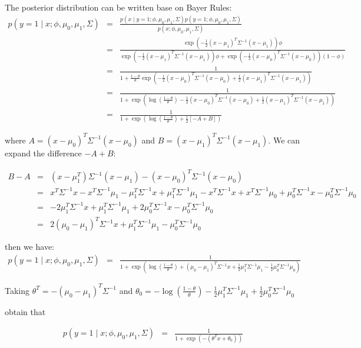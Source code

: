 \begin{answer}
The posterior distribution can be written base on Bayer Rules: 
%
\begin{eqnarray*}
	p(y = 1\mid x; \phi, \mu_0, \mu_1, \Sigma) &=& \frac{p(x\mid y=1; \phi, \mu_0, \mu_1, \Sigma) p(y = 1; \phi, \mu_0, \mu_1, \Sigma)}{p(x; \phi, \mu_0, \mu_1, \Sigma)} \\
&=& \frac{\exp\left(-\frac{1}{2}(x-\mu_1)^T \Sigma^{-1} (x-\mu_1) \right)\phi}{\exp\left(-\frac{1}{2}(x-\mu_1)^T \Sigma^{-1} (x-\mu_1) \right)\phi +\exp\left(-\frac{1}{2}(x-\mu_{0})^T \Sigma^{-1} (x-\mu_{0})\right) (1-\phi) }\\
&=& \frac{1}{1+ \frac{ 1- \theta}{\theta} \exp\left(-\frac{1}{2}(x-\mu_{0})^T \Sigma^{-1} (x-\mu_{0}) + \frac{1}{2}(x-\mu_1)^T \Sigma^{-1} (x-\mu_1) \right) }\\
&=& \frac{1}{1+  \exp\left(\log(\frac{ 1- \theta}{\theta})-\frac{1}{2}(x-\mu_{0})^T \Sigma^{-1} (x-\mu_{0}) + \frac{1}{2}(x-\mu_1)^T \Sigma^{-1} (x-\mu_1) \right) }\\
&=& \frac{1}{1+  \exp\left(\log(\frac{ 1- \theta}{\theta})+\frac{1}{2} [- A + B ] \right) }
\end{eqnarray*}

where  $A = (x-\mu_{0})^T \Sigma^{-1} (x-\mu_{0})$ and  $B = (x-\mu_1)^T \Sigma^{-1} (x-\mu_1)$. We can expand the difference $-A + B$:

\begin{eqnarray*}
B-A &=& (x-\mu_{1}^T)\Sigma^{-1} (x-\mu_{1}) - (x-\mu_{0})^T \Sigma^{-1} (x-\mu_{0})\\
&=& x^T\Sigma^{-1}x -x^T\Sigma^{-1}\mu_{1} -\mu_{1}^T\Sigma^{-1}x + \mu_{1}^T\Sigma^{-1}\mu_{1} -x^T\Sigma^{-1}x +x^T\Sigma^{-1}\mu_{0} +\mu_{0}^T\Sigma^{-1}x -\mu_{0}^T\Sigma^{-1}\mu_{0} \\
&=& -2\mu_{1}^T\Sigma^{-1}x + \mu_{1}^T\Sigma^{-1}\mu_{1} +2\mu_{0}^T\Sigma^{-1}x -\mu_{0}^T\Sigma^{-1}\mu_{0} \\
&=& 2(\mu_{0} - \mu_{1})^T\Sigma^{-1}x + \mu_{1}^T\Sigma^{-1}\mu_{1} -\mu_{0}^T\Sigma^{-1}\mu_{0}
\end{eqnarray*}

then we have:
\begin{eqnarray*}
p(y = 1\mid x; \phi, \mu_0, \mu_1, \Sigma) &=& \frac{1}{1+  \exp\left(\log(\frac{ 1- \theta}{\theta})+ (\mu_{0} - \mu_{1})^T\Sigma^{-1}x + \frac{1}{2}\mu_{1}^T\Sigma^{-1}\mu_{1} -\frac{1}{2}\mu_{0}^T\Sigma^{-1}\mu_{0} \right) }
\end{eqnarray*}

Taking $\theta^T = -(\mu_{0} - \mu_{1})^T\Sigma^{-1}$ and $\theta_{0} =-\log(\frac{ 1- \theta}{\theta})-  \frac{1}{2}\mu_{1}^T\Sigma^{-1}\mu_{1} +\frac{1}{2}\mu_{0}^T\Sigma^{-1}\mu_{0}$ 

obtain that

\begin{eqnarray*}
p(y = 1\mid x; \phi, \mu_0, \mu_1, \Sigma) &=& \frac{1}{1+  \exp\left( -(\theta^{T}x + \theta_{0}) \right) }
\end{eqnarray*}


%

\end{answer}
